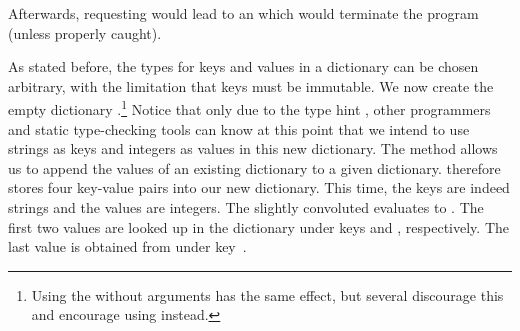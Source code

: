 Afterwards, requesting  would lead to an  which would terminate the program (unless properly caught).%
%
\begin{sloppypar}%
As stated before, the types for keys and values in a dictionary can be chosen arbitrary, with the limitation that keys must be immutable.
We now create the empty dictionary \pythonIdx{\textbraceleft\textbraceright}.\footnote{%
Using the  without arguments has the same effect, but several  discourage this and encourage using \pythonil{\{\}}\pythonIdx{\textbraceleft\textbraceright} instead.%
}
Notice that only due to the type hint , other programmers and static type-checking tools can know at this point that we intend to use strings as keys and integers as values in this new dictionary.
The  method allows us to append the values of an existing dictionary to a given dictionary.
 therefore stores four key-value pairs into our new dictionary.
This time, the keys are indeed strings and the values are integers.
The slightly convoluted   evaluates to .
The first two values are looked up in the  dictionary under keys  and , respectively.
The last value is obtained from  under key~.%
\end{sloppypar}%
%
\FloatBarrier%
\endhsection%
%
